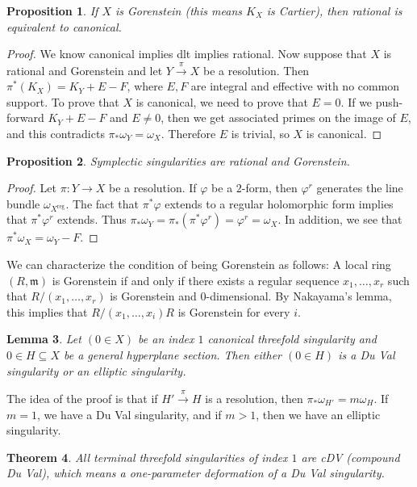 \documentclass[leqno, openany]{memoir}
\newtheorem{thm}{Theorem}[section]
\newtheorem{prop}[thm]{Proposition}
\newtheorem{lem}[thm]{Lemma}
\theoremstyle{definition}
\theoremstyle{remark}
\theoremstyle{plain}
\theoremstyle{definition}
\theoremstyle{remark}
\newcommand{\mf}[1]{\mathfrak{#1}}
\newcommand{\mr}[1]{\mathrm{#1}}
\begin{document}
\begin{prop}
    If $X$ is Gorenstein (this means $K_X$ is Cartier), then rational is equivalent to canonical.
\end{prop}

\begin{proof}
    We know canonical implies dlt implies rational. Now suppose that $X$ is rational and Gorenstein and let $Y \xrightarrow{\pi} X$ be a resolution. Then $\pi^*(K_X) = K_Y + E - F$, where $E, F$ are integral and effective with no common support. To prove that $X$ is canonical, we need to prove that $E = 0$. If we push-forward $K_Y + E - F$ and $E \neq 0$, then we get associated primes on the image of $E$, and this contradicts $\pi_* \omega_Y = \omega_X$. Therefore $E$ is trivial, so $X$ is canonical.
\end{proof}

\begin{prop}
    Symplectic singularities are rational and Gorenstein.
\end{prop}

\begin{proof}
    Let $\pi \colon Y \to X$ be a resolution. If $\varphi$ be a $2$-form, then $\varphi^r$ generates the line bundle $\omega_{X^{\mr{reg}}}$. The fact that $\pi^* \varphi$ extends to a regular holomorphic form implies that $\pi^* \varphi^r$ extends. Thus $\pi_* \omega_Y = \pi_* (\pi^*\varphi^r) = \varphi^r = \omega_X$. In addition, we see that $\pi^*\omega_X = \omega_Y - F$.
\end{proof}

We can characterize the condition of being Gorenstein as follows: A local ring $(R, \mf{m})$ is Gorenstein if and only if there exists a regular sequence $x_1, \ldots, x_r$ such that $R/(x_1, \ldots, x_r)$ is Gorenstein and $0$-dimensional. By Nakayama's lemma, this implies that $R/(x_1, \ldots, x_i) R$ is Gorenstein for every $i$.

\begin{lem}
    Let $(0 \in X)$ be an index $1$ canonical threefold singularity and $0 \in H \subseteq X$ be a general hyperplane section. Then either $(0 \in H)$ is a Du Val singularity or an elliptic singularity.
\end{lem}

The idea of the proof is that if $H' \xrightarrow{\pi} H$ is a resolution, then $\pi_* \omega_{H'} = m \omega_H$. If $m = 1$, we have a Du Val singularity, and if $m > 1$, then we have an elliptic singularity.

\begin{thm}
    All terminal threefold singularities of index $1$ are cDV (compound Du Val), which means a one-parameter deformation of a Du Val singularity.
\end{thm}
\end{document}
